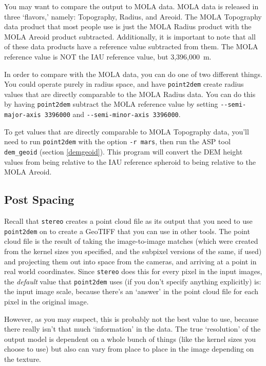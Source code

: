 You may want to compare the output to MOLA data.  MOLA data is
released in three `flavors,' namely: Topography, Radius, and Areoid.
The MOLA Topography data product that most people use is just the MOLA Radius
product with the MOLA Areoid product subtracted.  Additionally, it is
important to note that all of these data products have a reference
value subtracted from them.  The MOLA reference value is NOT the
IAU reference value, but 3,396,000~m.

In order to compare with the MOLA data, you can do one of two
different things.  You could operate purely in radius space, and
have \texttt{point2dem} create radius values that are directly
comparable to the MOLA Radius data.  You can do this by having
\texttt{point2dem} subtract the MOLA reference value by setting
\texttt{-\/-semi-major-axis 3396000} and \texttt{-\/-semi-minor-axis
3396000}.

To get values that are directly comparable to MOLA Topography data,
you'll need to run \texttt{point2dem} with the option \texttt{-r mars},
then run the ASP tool \texttt{dem\_geoid} (section \ref{demgeoid}). This
program will convert the DEM height values from being relative to the IAU
reference spheroid to being relative to the MOLA Areoid.

\subsection{Post Spacing}

Recall that \texttt{stereo} creates a point cloud file as its output
that you need to use \texttt{point2dem} on to create a GeoTIFF that
you can use in other tools.  The point cloud file is the result of
taking the image-to-image matches (which were created from the
kernel sizes you specified, and the subpixel versions of the same,
if used) and projecting them out into space from the cameras, and
arriving at a point in real world coordinates.  Since \texttt{stereo} does
this for every pixel in the input images, the \emph{default} value that
\texttt{point2dem} uses (if you don't specify anything explicitly) is: the
input image scale, because there's an `answer' in the point cloud
file for each pixel in the original image.

However, as you may suspect, this is probably not the best value to
use, because there really isn't that much `information' in the data.
The true `resolution' of the output model is dependent on a whole
bunch of things (like the kernel sizes you choose to use) but also can
vary from place to place in the image depending on the texture.


